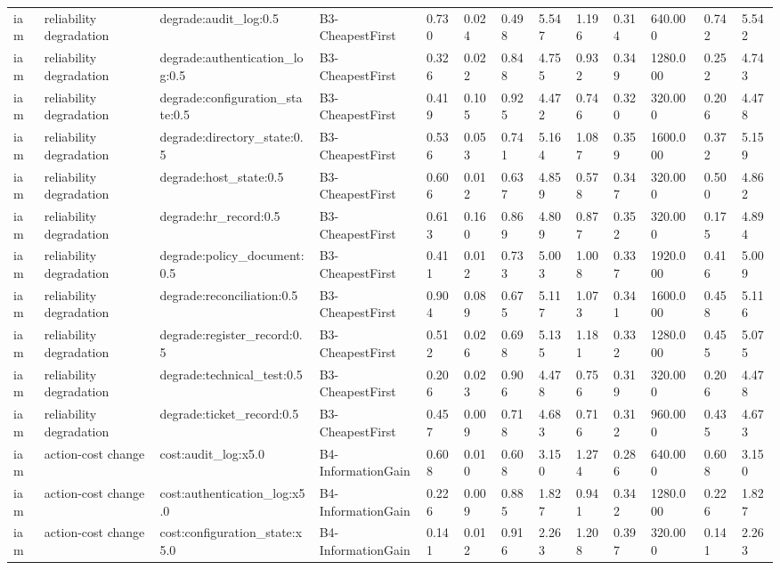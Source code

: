 \begin{table}[!ht]
{\begin{tabular}{lllllllllllll}
iam & reliability degradation & degrade:audit\_log:0.5 & B3-CheapestFirst & 0.730 & 0.024 & 0.498 & 5.547 & 1.196 & 0.314 & 640.000 & 0.742 & 5.542 \\
iam & reliability degradation & degrade:authentication\_log:0.5 & B3-CheapestFirst & 0.326 & 0.022 & 0.848 & 4.755 & 0.932 & 0.349 & 1280.000 & 0.252 & 4.743 \\
iam & reliability degradation & degrade:configuration\_state:0.5 & B3-CheapestFirst & 0.419 & 0.105 & 0.925 & 4.472 & 0.746 & 0.320 & 320.000 & 0.206 & 4.478 \\
iam & reliability degradation & degrade:directory\_state:0.5 & B3-CheapestFirst & 0.536 & 0.053 & 0.741 & 5.164 & 1.087 & 0.359 & 1600.000 & 0.372 & 5.159 \\
iam & reliability degradation & degrade:host\_state:0.5 & B3-CheapestFirst & 0.606 & 0.012 & 0.637 & 4.859 & 0.578 & 0.347 & 320.000 & 0.500 & 4.862 \\
iam & reliability degradation & degrade:hr\_record:0.5 & B3-CheapestFirst & 0.613 & 0.160 & 0.869 & 4.809 & 0.877 & 0.352 & 320.000 & 0.175 & 4.894 \\
iam & reliability degradation & degrade:policy\_document:0.5 & B3-CheapestFirst & 0.411 & 0.012 & 0.733 & 5.003 & 1.008 & 0.337 & 1920.000 & 0.416 & 5.009 \\
iam & reliability degradation & degrade:reconciliation:0.5 & B3-CheapestFirst & 0.904 & 0.089 & 0.675 & 5.117 & 1.073 & 0.341 & 1600.000 & 0.458 & 5.116 \\
iam & reliability degradation & degrade:register\_record:0.5 & B3-CheapestFirst & 0.512 & 0.026 & 0.698 & 5.135 & 1.181 & 0.332 & 1280.000 & 0.455 & 5.075 \\
iam & reliability degradation & degrade:technical\_test:0.5 & B3-CheapestFirst & 0.206 & 0.023 & 0.906 & 4.478 & 0.756 & 0.319 & 320.000 & 0.206 & 4.478 \\
iam & reliability degradation & degrade:ticket\_record:0.5 & B3-CheapestFirst & 0.457 & 0.009 & 0.718 & 4.683 & 0.716 & 0.312 & 960.000 & 0.435 & 4.673 \\
iam & action-cost change & cost:audit\_log:x5.0 & B4-InformationGain & 0.608 & 0.010 & 0.608 & 3.150 & 1.274 & 0.286 & 640.000 & 0.608 & 3.150 \\
iam & action-cost change & cost:authentication\_log:x5.0 & B4-InformationGain & 0.226 & 0.009 & 0.885 & 1.827 & 0.941 & 0.342 & 1280.000 & 0.226 & 1.827 \\
iam & action-cost change & cost:configuration\_state:x5.0 & B4-InformationGain & 0.141 & 0.012 & 0.916 & 2.263 & 1.208 & 0.397 & 320.000 & 0.141 & 2.263 \\

\end{tabular}}
\end{table}
